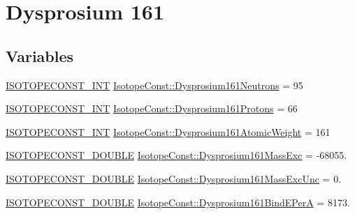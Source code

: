 \hypertarget{group___isotope_const-_dysprosium-_dy161}{}\section{Dysprosium 161}
\label{group___isotope_const-_dysprosium-_dy161}
\subsection*{Variables}
\begin{DoxyCompactItemize}
\item 
\mbox{\hyperlink{group___isotope_const-_macros_ga5f18360b3e99483a35c32d789e62621c}{I\+S\+O\+T\+O\+P\+E\+C\+O\+N\+S\+T\+\_\+\+I\+NT}} \mbox{\hyperlink{group___isotope_const-_dysprosium-_dy161_gac6088c8fd7ad22872dad734f34c8c755}{Isotope\+Const\+::\+Dysprosium161\+Neutrons}} = 95
\item 
\mbox{\hyperlink{group___isotope_const-_macros_ga5f18360b3e99483a35c32d789e62621c}{I\+S\+O\+T\+O\+P\+E\+C\+O\+N\+S\+T\+\_\+\+I\+NT}} \mbox{\hyperlink{group___isotope_const-_dysprosium-_dy161_gac4896dd297dde8697d56d59e6edd7587}{Isotope\+Const\+::\+Dysprosium161\+Protons}} = 66
\item 
\mbox{\hyperlink{group___isotope_const-_macros_ga5f18360b3e99483a35c32d789e62621c}{I\+S\+O\+T\+O\+P\+E\+C\+O\+N\+S\+T\+\_\+\+I\+NT}} \mbox{\hyperlink{group___isotope_const-_dysprosium-_dy161_ga46ca97bd5e364f7cf7914289d8aa2cb4}{Isotope\+Const\+::\+Dysprosium161\+Atomic\+Weight}} = 161
\item 
\mbox{\hyperlink{group___isotope_const-_macros_ga8f45a7272ce02c0b4c65c44636ed719a}{I\+S\+O\+T\+O\+P\+E\+C\+O\+N\+S\+T\+\_\+\+D\+O\+U\+B\+LE}} \mbox{\hyperlink{group___isotope_const-_dysprosium-_dy161_ga55fbce20196ce4152d71db8317020fc2}{Isotope\+Const\+::\+Dysprosium161\+Mass\+Exc}} = -\/68055.
\item 
\mbox{\hyperlink{group___isotope_const-_macros_ga8f45a7272ce02c0b4c65c44636ed719a}{I\+S\+O\+T\+O\+P\+E\+C\+O\+N\+S\+T\+\_\+\+D\+O\+U\+B\+LE}} \mbox{\hyperlink{group___isotope_const-_dysprosium-_dy161_gaa171441ccdc8827a840296218b69f0a3}{Isotope\+Const\+::\+Dysprosium161\+Mass\+Exc\+Unc}} = 0.
\item 
\mbox{\hyperlink{group___isotope_const-_macros_ga8f45a7272ce02c0b4c65c44636ed719a}{I\+S\+O\+T\+O\+P\+E\+C\+O\+N\+S\+T\+\_\+\+D\+O\+U\+B\+LE}} \mbox{\hyperlink{group___isotope_const-_dysprosium-_dy161_gae8da4c2af9c60931bc4dd173eeb5f838}{Isotope\+Const\+::\+Dysprosium161\+Bind\+E\+PerA}} = 8173.
\item 

\end{DoxyCompactItemize}
